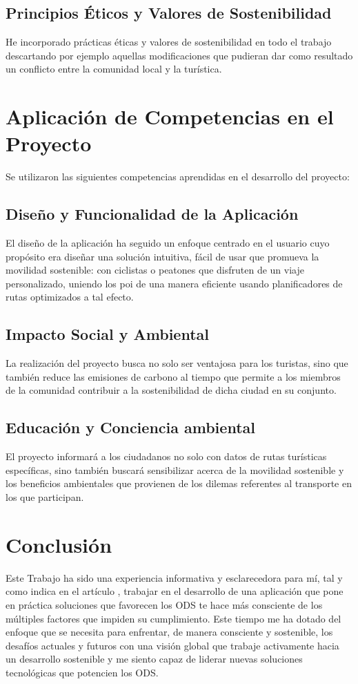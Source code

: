 	\subsection{Principios Éticos y Valores de Sostenibilidad}
	 He incorporado prácticas éticas y valores de sostenibilidad en todo el trabajo descartando por ejemplo aquellas modificaciones que pudieran dar como resultado un conflicto entre la comunidad local y la turística.
				
\section{Aplicación de Competencias en el Proyecto}
				
Se utilizaron las siguientes competencias aprendidas en el desarrollo del proyecto:
	\subsection{Diseño y Funcionalidad de la Aplicación}
						
	El diseño de la aplicación ha seguido un enfoque centrado en el usuario cuyo propósito era diseñar una solución intuitiva, fácil de usar que promueva la movilidad sostenible: con ciclistas o peatones que disfruten de un viaje personalizado, uniendo los \acrfull{poi} de una manera eficiente usando planificadores de rutas optimizados a tal efecto.
						
	\subsection{Impacto Social y Ambiental}
	La realización del proyecto busca no solo ser ventajosa para los turistas, sino que también reduce las emisiones de carbono al tiempo que permite a los miembros de la comunidad contribuir a la sostenibilidad de dicha ciudad en su conjunto.
							
	\subsection{Educación y Conciencia ambiental}
	El proyecto informará a los ciudadanos no solo con datos de rutas turísticas específicas, sino también buscará sensibilizar acerca de la movilidad sostenible y los beneficios ambientales que provienen de los dilemas referentes al transporte en los que participan.
								
\section {Conclusión}
Este Trabajo ha sido una experiencia informativa y esclarecedora para mí, tal y como indica en el artículo \cite{markiegi}, trabajar en el desarrollo de una aplicación que pone en práctica soluciones que favorecen los ODS te hace más consciente de los múltiples factores que impiden su cumplimiento. Este tiempo me ha dotado del enfoque que se necesita para enfrentar, de manera consciente y sostenible, los desafíos actuales y futuros con una visión global que trabaje activamente hacia un desarrollo sostenible y me siento capaz de liderar nuevas soluciones tecnológicas que potencien los ODS.

